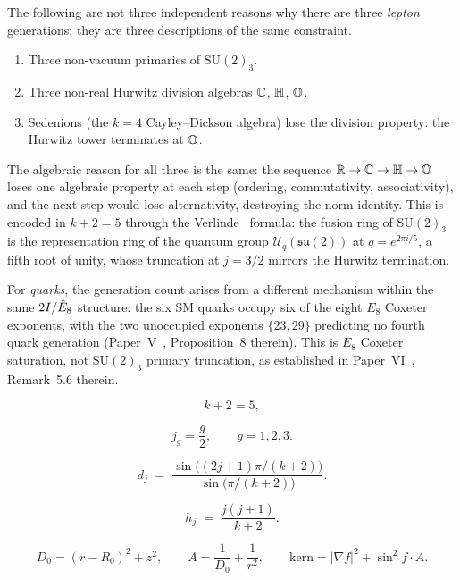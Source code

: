 \begin{remark}
\label{F:rem:three_descriptions}
The following are not three independent reasons why there are three
\emph{lepton} generations: they are three descriptions of the same constraint.
\begin{enumerate}[label=(\arabic*)]
  \item Three non-vacuum primaries of $\mathrm{SU}(2)_3$.
  \item Three non-real Hurwitz division algebras $\mathbb{C}$, $\mathbb{H}$, $\mathbb{O}$.
  \item Sedenions (the $k=4$ Cayley--Dickson algebra) lose the
    division property: the Hurwitz tower terminates at $\mathbb{O}$.
\end{enumerate}
The algebraic reason for all three is the same: the sequence
$\mathbb{R}\to\mathbb{C}\to\mathbb{H}\to\mathbb{O}$ loses one algebraic property at each step
(ordering, commutativity, associativity), and the next step would lose
alternativity, destroying the norm identity.
This is encoded in $k+2=5$ through the Verlinde~\cite{Verlinde1988} formula:
the fusion ring of $\mathrm{SU}(2)_3$ is the representation ring of
the quantum group $\mathcal{U}_q(\mathfrak{su}(2))$ at $q=e^{2\pi i/5}$,
a fifth root of unity, whose truncation at $j=3/2$ mirrors
the Hurwitz termination.

For \emph{quarks}, the generation count arises from a different mechanism
within the same $2I/\hat{E}_8$ structure: the six SM quarks occupy six of the
eight $E_8$ Coxeter exponents, with the two unoccupied exponents $\{23,29\}$
predicting no fourth quark generation (Paper~V~\cite{Paper5},
Proposition~8 therein).
This is $E_8$ Coxeter saturation, not $\mathrm{SU}(2)_3$ primary truncation,
as established in Paper~VI~\cite{Paper6}, Remark~5.6 therein.
\end{remark}

\begin{equation}
  k + 2 = 5,
  \label{F:eq:k_plus_2}
\end{equation}

\begin{equation}
  j_g = \frac{g}{2}, \qquad g = 1, 2, 3.
  \label{F:eq:generation_primaries}
\end{equation}

\begin{equation}
  d_j \;=\; \frac{\sin\!\bigl((2j+1)\pi/(k+2)\bigr)}
                  {\sin\!\bigl(\pi/(k+2)\bigr)}.
  \label{F:eq:qdim}
\end{equation}

\begin{equation}
  h_j \;=\; \frac{j(j+1)}{k+2}.
  \label{F:eq:conformal_weight}
\end{equation}

\begin{equation}
  D_0 = (r-R_0)^2 + z^2, \qquad
  A   = \frac{1}{D_0} + \frac{1}{r^2}, \qquad
  \mathrm{kern} = |\nabla f|^2 + \sin^2\!f\cdot A.
  \label{P1:eq:kern}
\end{equation}


